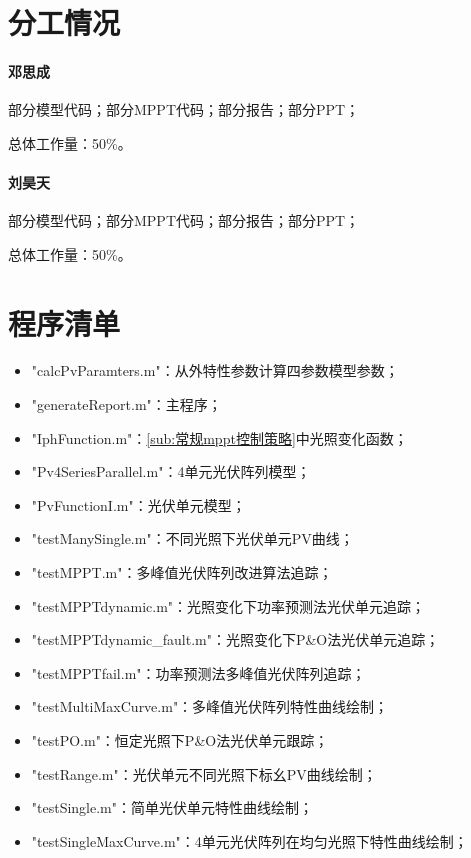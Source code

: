 \documentclass[a4paper,12pt]{article}
\begin{document}
    \begin{appendix}
        \section{分工情况} %
        \label{sec:fengong}
        \paragraph{邓思成} %
        \label{par:邓思成}
        部分模型代码；部分MPPT代码；部分报告；部分PPT；

        总体工作量：50\%。
        \paragraph{刘昊天} %
        \label{par:刘昊天}
        部分模型代码；部分MPPT代码；部分报告；部分PPT；

        总体工作量：50\%。

        \section{程序清单} %
        \label{sec:code}
        \begin{itemize}
          \item "calcPvParamters.m"：从外特性参数计算四参数模型参数；
          \item "generateReport.m"：主程序；
          \item "IphFunction.m"：\cref{sub:常规mppt控制策略}中光照变化函数；
          \item "Pv4SeriesParallel.m"：4单元光伏阵列模型；
          \item "PvFunctionI.m"：光伏单元模型；
          \item "testManySingle.m"：不同光照下光伏单元PV曲线；
          \item "testMPPT.m"：多峰值光伏阵列改进算法追踪；
          \item "testMPPTdynamic.m"：光照变化下功率预测法光伏单元追踪；
          \item "testMPPTdynamic\_fault.m"：光照变化下P\&O法光伏单元追踪；
          \item "testMPPTfail.m"：功率预测法多峰值光伏阵列追踪；
          \item "testMultiMaxCurve.m"：多峰值光伏阵列特性曲线绘制；
          \item "testPO.m"：恒定光照下P\&O法光伏单元跟踪；
          \item "testRange.m"：光伏单元不同光照下标幺PV曲线绘制；
          \item "testSingle.m"：简单光伏单元特性曲线绘制；
          \item "testSingleMaxCurve.m"：4单元光伏阵列在均匀光照下特性曲线绘制；
        \end{itemize}
    \end{appendix}

\end{document}
